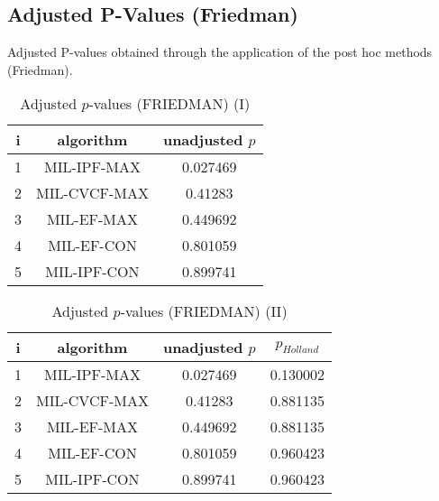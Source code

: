 \documentclass[a4paper,10pt]{article}
\begin{document}
\begin{landscape}
\newpage

\section{Adjusted P-Values (Friedman)}


Adjusted P-values obtained through the application of the post hoc methods (Friedman).

\begin{table}[!htp]
\centering\small
\begin{tabular}{ccc}
i&algorithm&unadjusted $p$\\
\hline1&MIL-IPF-MAX&0.027469\\2&MIL-CVCF-MAX&0.41283\\3&MIL-EF-MAX&0.449692\\4&MIL-EF-CON&0.801059\\5&MIL-IPF-CON&0.899741\\\hline
\end{tabular}
\caption{Adjusted $p$-values (FRIEDMAN) (I)}
\end{table}
\begin{table}[!htp]
\centering\small
\begin{tabular}{cccc}
i&algorithm&unadjusted $p$&$p_{Holland}$\\
\hline1&MIL-IPF-MAX&0.027469&0.130002\\2&MIL-CVCF-MAX&0.41283&0.881135\\3&MIL-EF-MAX&0.449692&0.881135\\4&MIL-EF-CON&0.801059&0.960423\\5&MIL-IPF-CON&0.899741&0.960423\\\hline
\end{tabular}
\caption{Adjusted $p$-values (FRIEDMAN) (II)}
\end{table}

\newpage
\end{landscape}
\end{document}
